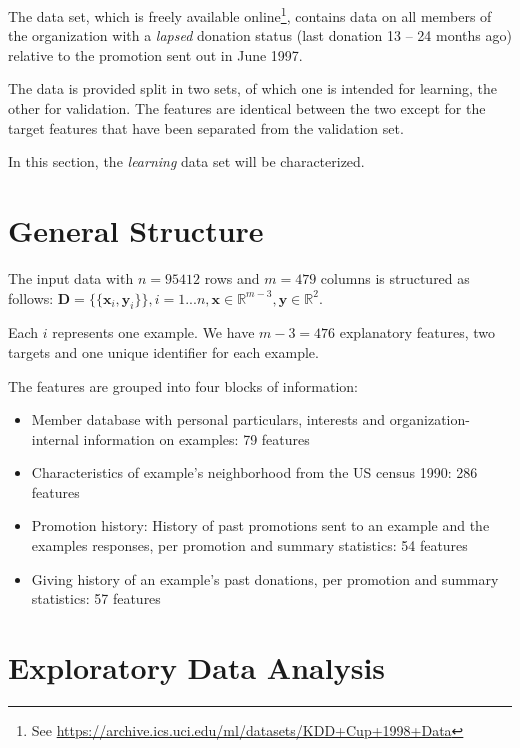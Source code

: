 \documentclass[
  11pt,
  a4paper,
  DIV=12,captions=tableheading,oneside,titlepage=firstiscover,abstracton]{scrreprt}
\providecommand{\tightlist}{%
  \setlength{\itemsep}{0pt}\setlength{\parskip}{0pt}}
\providecommand{\tightlist}{%
  \setlength{\itemsep}{0pt}\setlength{\parskip}{0pt}}
\begin{document}
The data set, which is freely available online\footnote{See \url{https://archive.ics.uci.edu/ml/datasets/KDD+Cup+1998+Data}}, contains data on all members of the organization with a \emph{lapsed} donation status (last donation 13 -- 24 months ago) relative to the promotion sent out in June 1997.

The data is provided split in two sets, of which one is intended for learning, the other for validation. The features are identical between the two except for the target features that have been separated from the validation set.

In this section, the \emph{learning} data set will be characterized.

\hypertarget{general-structure}{%
\section{General Structure}\label{general-structure}}

The input data with \(n = 95412\) rows and \(m= 479\) columns is structured as follows: \(\mathbf{D} = \{\{\mathbf{x}_i,\mathbf{y}_i\}\}, i = 1 ... n, \mathbf{x} \in \mathbb{R}^{m-3}, \mathbf{y} \in \mathbb{R}^2\).

Each \(i\) represents one example. We have \(m-3 = 476\) explanatory features, two targets and one unique identifier for each example.

The features are grouped into four blocks of information:

\begin{itemize}
\tightlist
\item
  Member database with personal particulars, interests and organization-internal information on examples: 79 features
\item
  Characteristics of example's neighborhood from the US census 1990: 286 features
\item
  Promotion history: History of past promotions sent to an example and the examples responses, per promotion and summary statistics: 54 features
\item
  Giving history of an example's past donations, per promotion and summary statistics: 57 features
\end{itemize}

\hypertarget{exploratory-data-analysis}{%
\section{Exploratory Data Analysis}\label{exploratory-data-analysis}}
\end{document}

